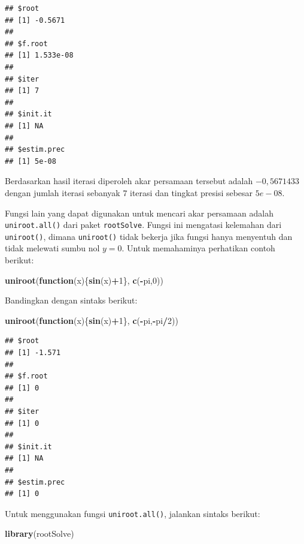 \documentclass[]{book}
\newenvironment{Shaded}{\begin{snugshade}}{\end{snugshade}}
\newcommand{\ControlFlowTok}[1]{\textcolor[rgb]{0.13,0.29,0.53}{\textbf{#1}}}
\newcommand{\DecValTok}[1]{\textcolor[rgb]{0.00,0.00,0.81}{#1}}
\newcommand{\KeywordTok}[1]{\textcolor[rgb]{0.13,0.29,0.53}{\textbf{#1}}}
\newcommand{\NormalTok}[1]{#1}
\newcommand{\OperatorTok}[1]{\textcolor[rgb]{0.81,0.36,0.00}{\textbf{#1}}}
\theoremstyle{definition}
\theoremstyle{definition}
\theoremstyle{definition}
\theoremstyle{remark}
\begin{document}
\begin{verbatim}
## $root
## [1] -0.5671
## 
## $f.root
## [1] 1.533e-08
## 
## $iter
## [1] 7
## 
## $init.it
## [1] NA
## 
## $estim.prec
## [1] 5e-08
\end{verbatim}

Berdasarkan hasil iterasi diperoleh akar persamaan tersebut adalah \(-0,5671433\) dengan jumlah iterasi sebanyak \(7\) iterasi dan tingkat presisi sebesar \(5e-08\).

Fungsi lain yang dapat digunakan untuk mencari akar persamaan adalah \texttt{uniroot.all()} dari paket \texttt{rootSolve}. Fungsi ini mengatasi kelemahan dari \texttt{uniroot()}, dimana \texttt{uniroot()} tidak bekerja jika fungsi hanya menyentuh dan tidak melewati sumbu nol \(y=0\). Untuk memahaminya perhatikan contoh berikut:

\begin{Shaded}
\begin{Highlighting}[]
\KeywordTok{uniroot}\NormalTok{(}\ControlFlowTok{function}\NormalTok{(x)\{}\KeywordTok{sin}\NormalTok{(x)}\OperatorTok{+}\DecValTok{1}\NormalTok{\}, }\KeywordTok{c}\NormalTok{(}\OperatorTok{-}\NormalTok{pi,}\DecValTok{0}\NormalTok{))}
\end{Highlighting}
\end{Shaded}

Bandingkan dengan sintaks berikut:

\begin{Shaded}
\begin{Highlighting}[]
\KeywordTok{uniroot}\NormalTok{(}\ControlFlowTok{function}\NormalTok{(x)\{}\KeywordTok{sin}\NormalTok{(x)}\OperatorTok{+}\DecValTok{1}\NormalTok{\}, }\KeywordTok{c}\NormalTok{(}\OperatorTok{-}\NormalTok{pi,}\OperatorTok{-}\NormalTok{pi}\OperatorTok{/}\DecValTok{2}\NormalTok{))}
\end{Highlighting}
\end{Shaded}

\begin{verbatim}
## $root
## [1] -1.571
## 
## $f.root
## [1] 0
## 
## $iter
## [1] 0
## 
## $init.it
## [1] NA
## 
## $estim.prec
## [1] 0
\end{verbatim}

Untuk menggunakan fungsi \texttt{uniroot.all()}, jalankan sintaks berikut:

\begin{Shaded}
\begin{Highlighting}[]
\KeywordTok{library}\NormalTok{(rootSolve)}
\end{Highlighting}
\end{Shaded}
\end{document}

